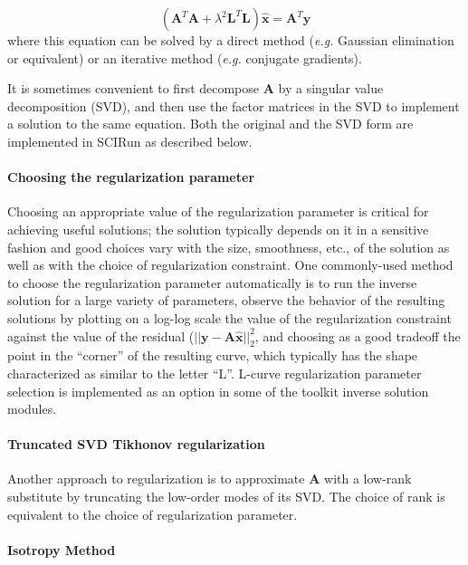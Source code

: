 \begin{equation}  \left(\mathbf{A}^T\mathbf{A} + \lambda^2 \mathbf{L}^T\mathbf{L}\right)\hat{\mathbf{x}}=\mathbf{A}^T\mathbf{y} \end{equation} 
where this equation can be solved by a direct method (\textit{e.g.}
Gaussian elimination or equivalent) or an iterative method (\textit{e.g.}
conjugate gradients). 

It is sometimes convenient to first decompose $\mathbf{A}$ by a
singular value decomposition (SVD), and then use the factor matrices in the
SVD to implement a solution to the same equation. Both the original and the
SVD form are implemented in SCIRun as described below.

\paragraph{Choosing the regularization parameter}

Choosing an appropriate value of the regularization parameter is critical
for achieving useful solutions; the solution typically depends on it in a
sensitive fashion and good choices vary with the size, smoothness, etc., of
the solution as well as with the choice of regularization constraint.  One
commonly-used method to choose the regularization parameter automatically
is to run the inverse solution for a large variety of parameters, observe
the behavior of the resulting solutions by plotting on a log-log scale the
value of the regularization constraint against the value of the residual
($||\mathbf{y}-\mathbf{A}\mathbf{\hat{x}}||_{2}^{2}$, and choosing as a
good tradeoff the point in the ``corner'' of the resulting curve, which
typically has the shape characterized as similar to the letter
``L''. L-curve regularization parameter selection is implemented as an
option in some of the toolkit inverse solution modules.

\paragraph{Truncated SVD Tikhonov regularization}

Another approach to regularization is to approximate $\mathbf{A}$ with a
low-rank substitute by truncating the low-order modes of its SVD. The
choice of rank is equivalent to the choice of regularization parameter. 

\paragraph{Isotropy Method}

